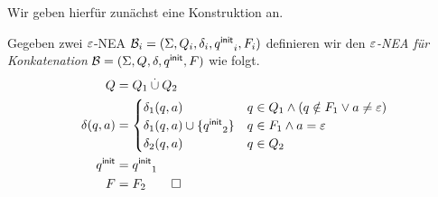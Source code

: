 Wir geben hierfür zunächst eine Konstruktion an.

\begin{Def}
Gegeben zwei $\varepsilon$-NEA $\mathcal{B}_i= (\Sigma, Q_i,\delta_i,{q^\mathsf{init}}_i,F_i)$ definieren wir den \emph{$\varepsilon$-NEA für Konkatenation} $\mathcal{B}= (\Sigma, Q,\delta,{q^\mathsf{init}},F)$ wie folgt.
                \begin{align*}
                Q &= Q_1 \overset.\cup Q_2\\
                \delta(q,a) &=
                                \begin{cases}
                                        \delta_1(q,a) & q\in Q_1\land (q\notin F_1 \lor a\neq \varepsilon)\\
                                        \delta_1(q,a)\cup\{{q^\mathsf{init}}_2\} & q\in F_1\land a=\varepsilon\\
                                        \delta_2(q,a) & q\in Q_2
                                \end{cases}\\
                {q^\mathsf{init}} & = {q^\mathsf{init}}_1\\
                F &= F_2 \qedhere
                \end{align*}
\end{Def}

